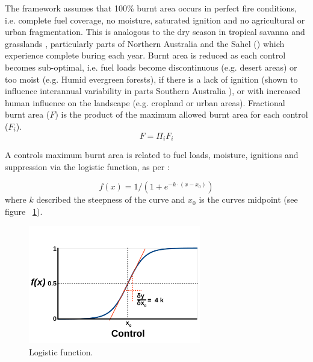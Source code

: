 The framework assumes that 100\% burnt area occurs in perfect fire conditions,  i.e. complete fuel coverage, no moisture, saturated ignition and no agricultural or urban fragmentation. This is analogous to the dry season in tropical savanna and grasslands \citep{kelley2014modelling}, particularly parts of Northern Australia \citep{murphy2013fire} and the Sahel () which experience complete buring each year.
Burnt area is reduced as each control becomes sub-optimal, i.e.
    fuel loads become discontinuous  (e.g. desert areas)
    or too moist (e.g. Humid evergreen forests),
    if there is a lack of ignition (shown to influence interannual variability in parts Southern Australia \cite{bradstock2010biogeographic} ),
    or with increased human influence on the landscape (e.g. cropland or urban areas).
Fractional burnt area ($F$) is the product of the maximum allowed burnt area for each control ($F_i$).
\begin{equation}
    F=\Pi_{i} F_i
    \label{equ:LimFIRE}
\end{equation}

A controls maximum burnt area is related to fuel loads, moisture, ignitions and suppression via the logistic function, as per \citet{bistinas2014causal}:

\begin{equation}
    f(x) = 1 / (1 + e^{-k \cdot (x - x_0)})
    \label{equ:fx}
\end{equation}
where $k$ described the steepness of the curve and $x_0$ is the curves midpoint (see figure ~\ref{fig:Logistic_fun}).

\begin{figure}[!ht]
  \centering
    \includegraphics[width=0.67\textwidth]{Logistic_fun.pdf}
  \caption{Logistic function.}
  \label{fig:Logistic_fun}
\end{figure}

